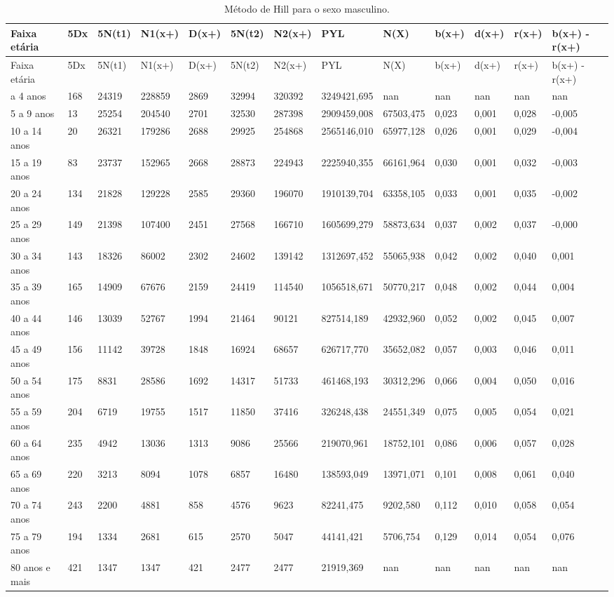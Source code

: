 \documentclass[
  12pt,
  a4paper,
]{scrreprt}
\begin{document}
\begin{longtable}[]{@{}lllllllllllll@{}}
\caption{Método de Hill para o sexo
masculino.}\label{T_5a126}\tabularnewline
\toprule\noalign{}
Faixa etária & 5Dx & 5N(t1) & N1(x+) & D(x+) & 5N(t2) & N2(x+) & PYL &
N(X) & b(x+) & d(x+) & r(x+) & b(x+) - r(x+) \\
\midrule\noalign{}
\endfirsthead
\toprule\noalign{}
Faixa etária & 5Dx & 5N(t1) & N1(x+) & D(x+) & 5N(t2) & N2(x+) & PYL &
N(X) & b(x+) & d(x+) & r(x+) & b(x+) - r(x+) \\
\midrule\noalign{}
\endhead
\bottomrule\noalign{}
\endlastfoot
0 a 4 anos & 168 & 24319 & 228859 & 2869 & 32994 & 320392 & 3249421,695
& nan & nan & nan & nan & nan \\
5 a 9 anos & 13 & 25254 & 204540 & 2701 & 32530 & 287398 & 2909459,008 &
67503,475 & 0,023 & 0,001 & 0,028 & -0,005 \\
10 a 14 anos & 20 & 26321 & 179286 & 2688 & 29925 & 254868 & 2565146,010
& 65977,128 & 0,026 & 0,001 & 0,029 & -0,004 \\
15 a 19 anos & 83 & 23737 & 152965 & 2668 & 28873 & 224943 & 2225940,355
& 66161,964 & 0,030 & 0,001 & 0,032 & -0,003 \\
20 a 24 anos & 134 & 21828 & 129228 & 2585 & 29360 & 196070 &
1910139,704 & 63358,105 & 0,033 & 0,001 & 0,035 & -0,002 \\
25 a 29 anos & 149 & 21398 & 107400 & 2451 & 27568 & 166710 &
1605699,279 & 58873,634 & 0,037 & 0,002 & 0,037 & -0,000 \\
30 a 34 anos & 143 & 18326 & 86002 & 2302 & 24602 & 139142 & 1312697,452
& 55065,938 & 0,042 & 0,002 & 0,040 & 0,001 \\
35 a 39 anos & 165 & 14909 & 67676 & 2159 & 24419 & 114540 & 1056518,671
& 50770,217 & 0,048 & 0,002 & 0,044 & 0,004 \\
40 a 44 anos & 146 & 13039 & 52767 & 1994 & 21464 & 90121 & 827514,189 &
42932,960 & 0,052 & 0,002 & 0,045 & 0,007 \\
45 a 49 anos & 156 & 11142 & 39728 & 1848 & 16924 & 68657 & 626717,770 &
35652,082 & 0,057 & 0,003 & 0,046 & 0,011 \\
50 a 54 anos & 175 & 8831 & 28586 & 1692 & 14317 & 51733 & 461468,193 &
30312,296 & 0,066 & 0,004 & 0,050 & 0,016 \\
55 a 59 anos & 204 & 6719 & 19755 & 1517 & 11850 & 37416 & 326248,438 &
24551,349 & 0,075 & 0,005 & 0,054 & 0,021 \\
60 a 64 anos & 235 & 4942 & 13036 & 1313 & 9086 & 25566 & 219070,961 &
18752,101 & 0,086 & 0,006 & 0,057 & 0,028 \\
65 a 69 anos & 220 & 3213 & 8094 & 1078 & 6857 & 16480 & 138593,049 &
13971,071 & 0,101 & 0,008 & 0,061 & 0,040 \\
70 a 74 anos & 243 & 2200 & 4881 & 858 & 4576 & 9623 & 82241,475 &
9202,580 & 0,112 & 0,010 & 0,058 & 0,054 \\
75 a 79 anos & 194 & 1334 & 2681 & 615 & 2570 & 5047 & 44141,421 &
5706,754 & 0,129 & 0,014 & 0,054 & 0,076 \\
80 anos e mais & 421 & 1347 & 1347 & 421 & 2477 & 2477 & 21919,369 & nan
& nan & nan & nan & nan \\
\end{longtable}
\end{document}
